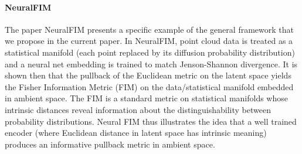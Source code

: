 \documentclass{article}
\theoremstyle{plain}
\theoremstyle{definition}
\theoremstyle{remark}
\newcommand{\xin}[1]{\textcolor{teal}{[XS: #1]}}
\newcommand{\danqi}[1]{\textcolor{cyan}{[Danqi: #1]}}
\newcommand{\ian}[1]{\textcolor{green}{[Ian: #1]}}
\begin{document}
\begin{comment}
A Riemannian metric is a square matrix $g$ defined for every point $x$ which, through the inner product $\langle v, v\rangle_{g}=u g v^{\top}$, describes the difficulty of moving in each direction around that point. \ian{I don't understand this difficulty comment, maybe you are thinking about the Jacobian?}

The pullback metric given by a map $\varphi: X \rightarrow Y$ ``pulls'' the metric $g_{Y}$ on $Y$ into a metric $\varphi^* g_Y$ on $X$. To find $\left\langle x_{1}, x_{2}\right\rangle_{\varphi} g_{r}$, you use the differential $d\varphi$ (also known, in neural networks, as the Jacobian $J_{\varphi}$) to map tangent vectors from $X$ to $Y$. The pullback metric is then defined as 

$$
\left\langle J_{\varphi} \left(x_{1}\right), J_{\varphi}\left(x_{2}\right)\right\rangle_{g_Y}
$$
, the inner product in $Y$ with respect to $Y$'s metric $g_Y$ at the point $\varphi{x}$.
\xin{add Neural FIM} \ian{would also just use the language and notation from my write up, feel free to copy/paste the relevant sections, I even comment briefly on the relation to neuralFIM}
\section{Related Work}
Several prior works have been done on learning continuous metrics in data ambient space. Neural FIM [CITE] learns the Fisher Information Metric from point cloud data by matching Jensen-Shannon divergence between rows of distribution in a latent statistical manifold with Jensen-Shannon divergence between rows of diffusion probability from PHATE operator. \danqi{data manifold interpolation}


\end{comment}


\paragraph{NeuralFIM}

The paper NeuralFIM presents a specific example of the general framework that we propose in the current paper. In NeuralFIM, point cloud data is treated as a statistical manifold (each point replaced by its diffusion probability distribution) and a neural net embedding is trained to match Jenson-Shannon divergence. It is shown then that the pullback of the Euclidean metric on the latent space yields the Fisher Information Metric (FIM) on the data/statistical manifold embedded in ambient space. The FIM is a standard metric on statistical manifolds whose intrinsic distances reveal information about the distinguishability between probability distributions. Neural FIM thus illustrates the idea that a well trained encoder (where Euclidean distance in latent space has intrinsic meaning) produces an informative pullback metric in ambient space. 
\end{document}
